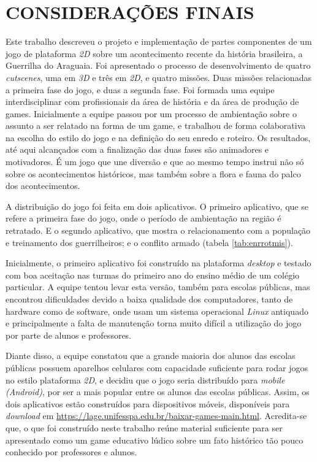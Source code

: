 
\chapter{CONSIDERAÇÕES FINAIS}
\label{chap:conclusao}

Este trabalho descreveu o projeto e implementação de partes componentes de um jogo de plataforma \textit{2D} sobre um acontecimento recente da história brasileira, a Guerrilha do Araguaia. Foi apresentado o processo de desenvolvimento de quatro \textit{cutscenes}, uma em \textit{3D} e três em \textit{2D}, e quatro missões. Duas missões relacionadas a primeira fase do jogo, e duas a segunda fase. Foi formada uma equipe interdisciplinar com profissionais da área de história e da área de produção de games. Inicialmente a equipe passou por um processo de ambientação sobre o assunto a ser relatado na forma de um game, e trabalhou de forma colaborativa na escolha do estilo do jogo e na definição do seu enredo e roteiro. Os resultados, até aqui alcançados com a finalização das duas fases são animadores e motivadores. É um jogo que une diversão e que ao mesmo tempo instrui não só sobre os acontecimentos históricos, mas também sobre a flora e fauna do palco dos acontecimentos.

A distribuição do jogo foi feita em dois aplicativos. O primeiro aplicativo, que se refere a primeira fase do jogo, onde o período de ambientação na região é retratado. E o segundo aplicativo, que mostra o relacionamento com a população e treinamento dos guerrilheiros; e o conflito armado (tabela \ref{tab:enrrotmis}).

Inicialmente, o primeiro aplicativo foi construído na plataforma \textit{desktop} e testado com boa aceitação nas turmas do primeiro ano do ensino médio de um colégio particular. A equipe tentou levar esta versão, também para escolas públicas, mas encontrou dificuldades devido a baixa qualidade dos computadores, tanto de hardware como de software, onde usam um sistema operacional \textit{Linux} antiquado e principalmente a falta de manutenção torna muito difícil a utilização do jogo por parte de alunos e professores.

Diante disso, a equipe constatou que a grande maioria dos alunos das escolas públicas possuem aparelhos celulares com capacidade suficiente para rodar jogos no estilo plataforma \textit{2D}, e decidiu que o jogo seria distribuído para \textit{mobile} \textit{(Android)}, por ser a mais popular entre os alunos das escolas públicas. Assim, os dois aplicativos estão construídos para dispositivos móveis, disponíveis para \textit{download} em \url{https://lage.unifesspa.edu.br/baixar-games-main.html}. Acredita-se que, o que foi construído neste trabalho reúne material suficiente para ser apresentado como um game educativo lúdico sobre um fato histórico tão pouco conhecido por professores e alunos.

